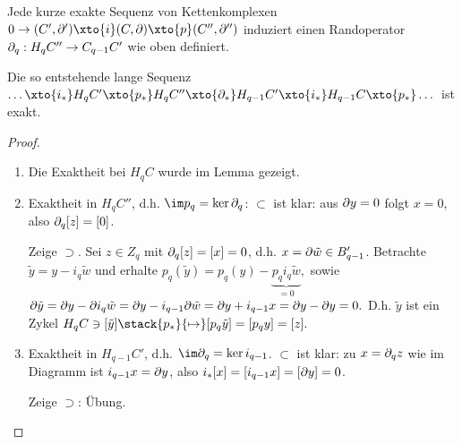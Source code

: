 \begin{st}
    Jede kurze exakte Sequenz von Kettenkomplexen
    \begin{math}
        0 \to (C', \del') \xto{i} (C, \del) \xto{p} (C'', \del'')
    \end{math}
    induziert einen Randoperator $\mathord{\partial}_q: H_q C'' \to C_{q-1} C'$ wie oben definiert.

    Die so entstehende lange Sequenz
    \begin{math}
        \dotsc \xto{i_*} H_q C' \xto{p_*} H_q C'' \xto{\del_*} H_{q-1} C' \xto{i_*} H_{q-1} C \xto{p_*} \dotsc
    \end{math}
    ist exakt.
    \begin{proof}
        \begin{enumerate}[1)]
            \item
                Die Exaktheit bei $H_q C$ wurde im Lemma gezeigt.
            \item
                Exaktheit in $H_q C''$, d.h. $\im p_q = \ker \del_q$:
                $\subset$ ist klar: aus $\mathord{\partial} y = 0$ folgt $x = 0$, also $\mathord{\partial}_q[z] = [0]$.

                Zeige $\supset$.
                Sei $z \in Z_q$ mit $\mathord{\partial}_q[z] = [x] = 0$, d.h. $x = \mathord{\partial} \tilde w \in B_{q-1}'$.
                Betrachte $\tilde y = y - i_q \tilde w$ und erhalte
                \begin{math}
                    p_q(\tilde y) = p_q(y) - \underbrace{p_q i_q \tilde w}_{=0},
                \end{math}
                sowie
                \begin{math}
                    \mathord{\partial} \tilde y
                    = \mathord{\partial} y - \mathord{\partial} i_q \tilde w
                    = \mathord{\partial} y - i_{q-1} \mathord{\partial} \tilde w
                    = \mathord{\partial} y + i_{q-1} x
                    = \mathord{\partial} y - \mathord{\partial} y
                    = 0.
                \end{math}
                D.h. $\tilde y$ ist ein Zykel
                \begin{math}
                    H_q C \ni [\tilde y]
                    \stack{p_*}{\mapsto}
                    [p_q \tilde y] = [p_q y] = [z].
                \end{math}
            \item
                Exaktheit in $H_{q-1}C'$, d.h. $\im \del_q = \ker i_{q-1}$.
                $\subset$ ist klar: zu $x = \mathord{\partial}_q z$ wie im Diagramm ist $i_{q-1} x = \mathord{\partial} y$, also $i_*[x] = [i_{q-1} x] = [\mathord{\partial} y] = 0$.

                Zeige $\supset$: Übung.
        \end{enumerate}
    \end{proof}
\end{st}


